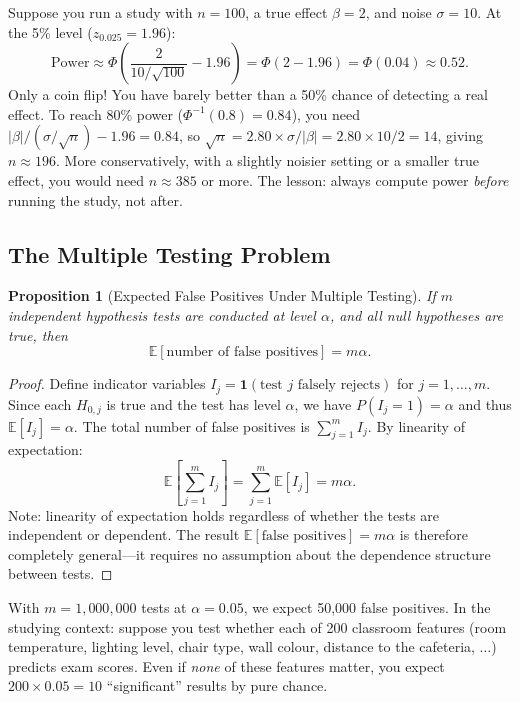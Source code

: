 \documentclass[11pt,a4paper]{article}
\theoremstyle{definition}
\theoremstyle{plain}
\newtheorem{proposition}{Proposition}[section]
\theoremstyle{remark}
\newcommand{\E}{\mathbb{E}}
\begin{document}
\begin{numermark}[title={A Power Calculation You Can Do on Paper}]
Suppose you run a study with $n = 100$, a true effect $\beta = 2$, and noise $\sigma = 10$. At the 5\% level ($z_{0.025} = 1.96$):
\[
  \text{Power} \approx \Phi\!\left(\frac{2}{10/\sqrt{100}} - 1.96\right) = \Phi(2 - 1.96) = \Phi(0.04) \approx 0.52.
\]
Only a coin flip! You have barely better than a 50\% chance of detecting a real effect. To reach 80\% power ($\Phi^{-1}(0.8) = 0.84$), you need $|\beta|/(\sigma/\sqrt{n}) - 1.96 = 0.84$, so $\sqrt{n} = 2.80 \times \sigma / |\beta| = 2.80 \times 10 / 2 = 14$, giving $n \approx 196$. More conservatively, with a slightly noisier setting or a smaller true effect, you would need $n \approx 385$ or more. The lesson: always compute power \emph{before} running the study, not after.
\end{numermark}

\subsection{The Multiple Testing Problem}

\begin{proposition}[Expected False Positives Under Multiple Testing]\label{prop:multiple-testing}
If $m$ independent hypothesis tests are conducted at level $\alpha$, and \emph{all} null hypotheses are true, then
\[
  \E[\text{number of false positives}] = m\alpha.
\]
\end{proposition}

\begin{proof}
Define indicator variables $I_j = \mathbf{1}(\text{test } j \text{ falsely rejects})$ for $j = 1, \ldots, m$.
Since each $H_{0,j}$ is true and the test has level $\alpha$, we have $P(I_j = 1) = \alpha$ and thus $\E[I_j] = \alpha$.
The total number of false positives is $\sum_{j=1}^m I_j$. By linearity of expectation:
\[
  \E\!\left[\sum_{j=1}^m I_j\right] = \sum_{j=1}^m \E[I_j] = m\alpha.
\]
Note: linearity of expectation holds regardless of whether the tests are independent or dependent. The result $\E[\text{false positives}] = m\alpha$ is therefore completely general---it requires no assumption about the dependence structure between tests.
\end{proof}

With $m = 1{,}000{,}000$ tests at $\alpha = 0.05$, we expect 50{,}000 false positives. In the studying context: suppose you test whether each of 200 classroom features (room temperature, lighting level, chair type, wall colour, distance to the cafeteria, $\ldots$) predicts exam scores. Even if \emph{none} of these features matter, you expect $200 \times 0.05 = 10$ ``significant'' results by pure chance.
\end{document}
